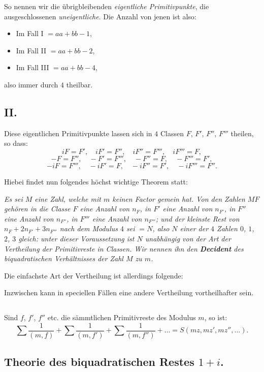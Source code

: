 \documentclass[12pt,a4paper]{article}
\begin{document}
So nennen wir die übrigbleibenden \textit{eigentliche Primitivpunkte}, die ausgeschlossenen
\textit{uneigentliche}. Die Anzahl von jenen ist also:
\begin{itemize}
\item Im Fall I $= aa + bb - 1$,
\item Im Fall II $= aa + bb - 2$,
\item Im Fall III $= aa + bb - 4$,
\end{itemize}
also immer durch $4$ theilbar.


\subsection*{II.}

Diese eigentlichen Primitivpunkte lassen sich in $4$ Classen $F$, $F'$, $F''$, $F'''$ theilen, so dass:
\[
iF = F', \quad iF' = F'', \quad iF'' = F''', \quad iF''' = F,
\]
\[
-F = F'', \quad -F' = F''', \quad -F'' = F, \quad -F''' = F',
\]
\[
-iF = F''', \quad -iF' = F, \quad -iF'' = F', \quad -iF''' = F''.
\]

Hiebei findet nun folgendes höchst wichtige Theorem statt:

\textit{Es sei $M$ eine Zahl, welche mit $m$ keinen Factor gemein hat. Von den Zahlen $MF$ gehören
in die Classe $F$ eine Anzahl von $n_F$, in $F'$ eine Anzahl von $n_{F'}$, in $F''$ eine Anzahl von $n_{F''}$,
in $F'''$ eine Anzahl von $n_{F'''}$; und der kleinste Rest von $n_F + 2n_{F'} + 3n_{F'''}$ nach dem
Modulus $4$ sei $= N$, also $N$ einer der $4$ Zahlen $0$, $1$, $2$, $3$ gleich: unter dieser Voraussetzung
ist $N$ unabhängig von der Art der Vertheilung der Primitivreste in Classen. Wir nennen ihn den
\textbf{Decident} des biquadratischen Verhältnisses der Zahl $M$ zu $m$.}

Die einfachste Art der Vertheilung ist allerdings folgende:

Inzwischen kann in speciellen Fällen eine andere Vertheilung vortheilhafter sein.

\subsection*{}

Sind $f$, $f'$, $f''$ etc. die sämmtlichen Primitivreste des Modulus $m$, so ist:
\[
\sum \frac{1}{(m, f)} + \sum \frac{1}{(m, f')} + \sum \frac{1}{(m, f'')} + \ldots = S(mz, mz', mz'', \ldots).
\]

\subsection*{Theorie des biquadratischen Restes $1 + i$.}
\end{document}
